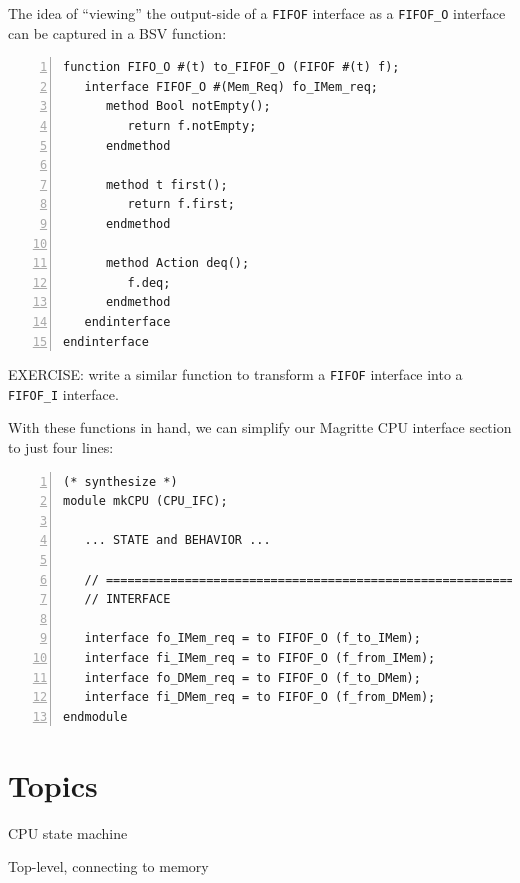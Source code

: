 
The idea of ``viewing'' the output-side of a \verb|FIFOF| interface as
a \verb|FIFOF_O| interface can be captured in a BSV function:

\begin{Verbatim}[frame=single, numbers=left]
function FIFO_O #(t) to_FIFOF_O (FIFOF #(t) f);
   interface FIFOF_O #(Mem_Req) fo_IMem_req;
      method Bool notEmpty();
         return f.notEmpty;
      endmethod

      method t first();
         return f.first;
      endmethod

      method Action deq();
         f.deq;
      endmethod
   endinterface
endinterface
\end{Verbatim}

EXERCISE: write a similar function to transform a \verb|FIFOF|
interface into a \verb|FIFOF_I| interface.

With these functions in hand, we can simplify our Magritte CPU
interface section to just four lines:

\begin{Verbatim}[frame=single, numbers=left]
(* synthesize *)
module mkCPU (CPU_IFC);

   ... STATE and BEHAVIOR ...

   // ================================================================
   // INTERFACE

   interface fo_IMem_req = to FIFOF_O (f_to_IMem);
   interface fi_IMem_req = to FIFOF_O (f_from_IMem);
   interface fo_DMem_req = to FIFOF_O (f_to_DMem);
   interface fi_DMem_req = to FIFOF_O (f_from_DMem);
endmodule
\end{Verbatim}


\section{Topics}

\begin{tightlist}

\item CPU state machine

\item Top-level, connecting to memory

\end{tightlist}

